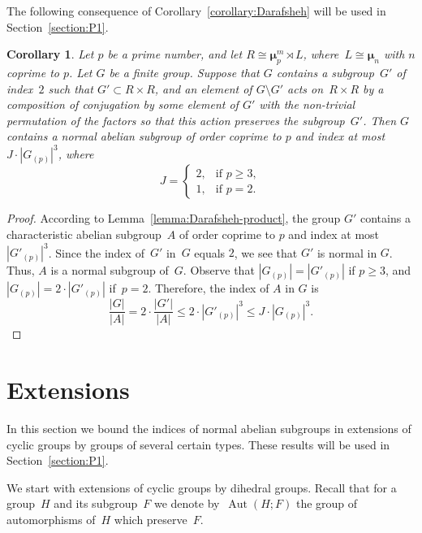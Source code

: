 \documentclass[12pt]{amsart}
\numberwithin{equation}{section}
\newtheorem{corollary}[subsection]{Corollary}
\theoremstyle{definition}
\newcommand{\mumu}{\boldsymbol{\mu}}
\DeclareMathOperator{\Aut}{Aut}
\def \ge {\geqslant}
\def \le {\leqslant}
\begin{document}
The following consequence of Corollary~\ref{corollary:Darafsheh} will be used in Section~\ref{section:P1}.

\begin{corollary}
\label{corollary:Darafsheh-product}
Let $p$ be a prime number, and let $R\cong\mumu_p^m\rtimes L$,
where~\mbox{$L\cong \mumu_n$} with $n$ coprime to $p$.
Let $G$ be a finite group.
Suppose that $G$ contains a subgroup~$G'$ of index~$2$ such that
$G'\subset R\times R$,
and an element of $G\setminus G'$ acts on~\mbox{$R\times R$} by a composition
of conjugation by some element of $G'$ with the non-trivial
permutation of the factors so that this action preserves
the subgroup~$G'$. Then $G$ contains a normal abelian subgroup of order coprime to $p$
and index at most~\mbox{$J\cdot |G_{(p)}|^{3}$},
where
\begin{equation*}
J=\begin{cases}
2, &\text{if\ } p\ge 3,\\
1, &\text{if\ } p=2.
\end{cases}
\end{equation*}
\end{corollary}

\begin{proof}
According to Lemma~\ref{lemma:Darafsheh-product}, the group
$G'$ contains a characteristic abelian subgroup~$A$ of order coprime to $p$ and
index at most $|G'_{(p)}|^3$.
Since the index of~$G'$ in~$G$ equals $2$, we see that $G'$ is normal in $G$.
Thus, $A$ is a normal subgroup of~$G$.
Observe that $|G_{(p)}|=|G'_{(p)}|$ if $p\ge 3$, and
$|G_{(p)}|=2\cdot |G'_{(p)}|$ if~\mbox{$p=2$}.
Therefore, the index of $A$ in $G$ is
$$
\frac{|G|}{|A|}=2\cdot \frac{|G'|}{|A|}\le
2\cdot |G'_{(p)}|^3\le J\cdot |G_{(p)}|^{3}.
$$
\end{proof}






\section{Extensions}
\label{section:extensions}

In this section we bound the indices of normal abelian subgroups in extensions of cyclic groups by groups of several certain types. These results will be used in
Section~\ref{section:P1}.

We start with extensions of cyclic groups by dihedral groups.
Recall that for a group~$H$ and its subgroup~$F$ we denote by~$\Aut(H;F)$ the group of
automorphisms of~$H$ which preserve~$F$.
\end{document}
